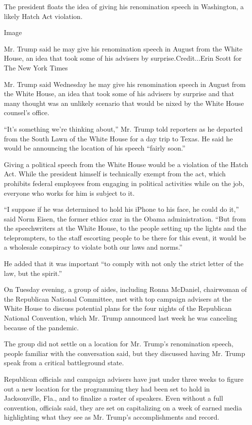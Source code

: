 The president floats the idea of giving his renomination speech in
Washington, a likely Hatch Act violation.

Image

Mr. Trump said he may give his renomination speech in August from the
White House, an idea that took some of his advisers by
surprise.Credit...Erin Scott for The New York Times

Mr. Trump said Wednesday he may give his renomination speech in August
from the White House, an idea that took some of his advisers by surprise
and that many thought was an unlikely scenario that would be nixed by
the White House counsel's office.

``It's something we're thinking about,'' Mr. Trump told reporters as he
departed from the South Lawn of the White House for a day trip to Texas.
He said he would be announcing the location of his speech ``fairly
soon.''

Giving a political speech from the White House would be a violation of
the Hatch Act. While the president himself is technically exempt from
the act, which prohibits federal employees from engaging in political
activities while on the job, everyone who works for him is subject to
it.

``I suppose if he was determined to hold his iPhone to his face, he
could do it,'' said Norm Eisen, the former ethics czar in the Obama
administration. ``But from the speechwriters at the White House, to the
people setting up the lights and the teleprompters, to the staff
escorting people to be there for this event, it would be a wholesale
conspiracy to violate both our laws and norms.''

He added that it was important ``to comply with not only the strict
letter of the law, but the spirit.''

On Tuesday evening, a group of aides, including Ronna McDaniel,
chairwoman of the Republican National Committee, met with top campaign
advisers at the White House to discuss potential plans for the four
nights of the Republican National Convention, which Mr. Trump announced
last week he was canceling because of the pandemic.

The group did not settle on a location for Mr. Trump's renomination
speech, people familiar with the conversation said, but they discussed
having Mr. Trump speak from a critical battleground state.

Republican officials and campaign advisers have just under three weeks
to figure out a new location for the programming they had been set to
hold in Jacksonville, Fla., and to finalize a roster of speakers. Even
without a full convention, officials said, they are set on capitalizing
on a week of earned media highlighting what they see as Mr. Trump's
accomplishments and record.

